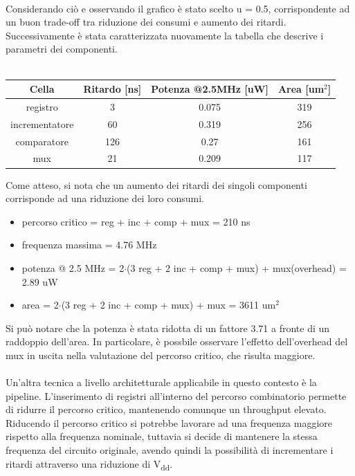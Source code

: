 \documentclass[11pt,  english, makeidx, a4paper, titlepage, oneside]{book}
\begin{document}
\\
Considerando ciò e osservando il grafico è stato scelto u = 0.5, corrispondente ad un buon trade-off tra riduzione dei consumi e aumento dei ritardi. Successivamente è stata caratterizzata nuovamente la tabella che descrive i parametri dei componenti.
\\\\
\begin{center}
	\begin{tabular}{|c|c|c|c|}
	\hline
	Cella & Ritardo [ns] & Potenza @2.5MHz [uW] & Area [um$^2$] \\
	\hline
	 registro & 3 & 0.075 & 319 \\
	\hline
	 incrementatore & 60 & 0.319 & 256 \\
	\hline
	 comparatore & 126 & 0.27 & 161 \\
	\hline
	 mux & 21 & 0.209 & 117 \\
	\hline
	\end{tabular}	
\end{center}
\vspace{0.3cm}
Come atteso, si nota che un aumento dei ritardi dei singoli componenti corrisponde ad una riduzione dei loro consumi.
\begin{itemize}
\item percorso critico = reg + inc + comp + mux = 210 ns
\item frequenza massima = 4.76 MHz
\item potenza @ 2.5 MHz = 2$\cdot$(3 reg + 2 inc + comp + mux) + mux(overhead) = 2.89 uW
\item area = 2$\cdot$(3 reg + 2 inc + comp + mux) + mux = 3611 um$^2$
\end{itemize}
\vspace{0.3cm}
Si può notare che la potenza è stata ridotta di un fattore 3.71 a fronte di un raddoppio dell'area. In particolare, è possbile osservare l'effetto dell'overhead del mux in uscita nella valutazione del percorso critico, che risulta maggiore.
\\\\
Un'altra tecnica a livello architetturale applicabile in questo contesto è la pipeline. L'inserimento di registri all'interno del percorso combinatorio permette di ridurre il percorso critico, mantenendo comunque un throughput elevato.
\\
Riducendo il percorso critico si potrebbe lavorare ad una frequenza maggiore rispetto alla frequenza nominale, tuttavia si decide di mantenere la stessa frequenza del circuito originale, avendo quindi la possibilità di incrementare i ritardi attraverso una riduzione di V\textsubscript{dd}.
\end{document}
